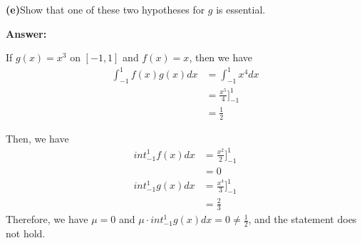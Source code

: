 \documentclass[a4paper,12pt]{report}
\begin{document}
\noindent
\textbf{(e)}Show that one of these two hypotheses for $g$ is essential. 

\noindent
\textbf{Answer: }

\noindent
If $g(x)=x^3$ on $[-1,1]$ and $f(x)=x$, then we have 
\begin{align*}
\int_{-1}^1f(x)g(x)dx&=\int_{-1}^1x^4dx\\
&=\frac{x^5}{4}]_{-1}^{1}\\
&=\frac{1}{2}
\end{align*}

\noindent
Then, we have 
\begin{align*}
int_{-1}^1f(x)dx&=\frac{x^2}{2}]_{-1}^1\\
&=0\\
int_{-1}^1g(x)dx&=\frac{x^4}{3}]_{-1}^1\\
&=\frac{2}{3}
\end{align*}
Therefore, we have $\mu =0$ and $\mu\cdot int_{-1}^1g(x)dx=0\neq \frac{1}{2}$, and the statement does not hold. 
\end{document}

